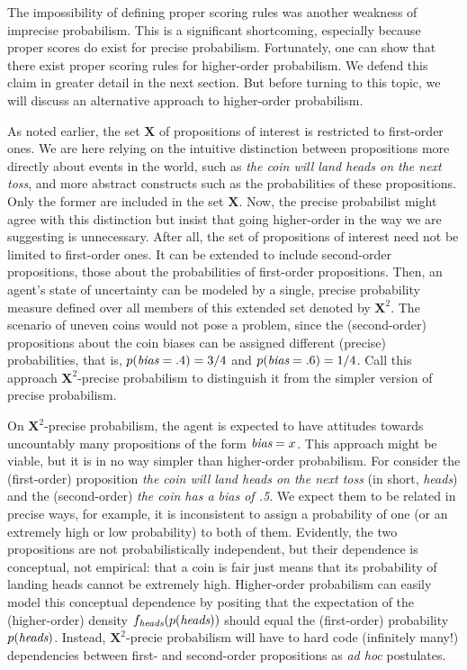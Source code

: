 \documentclass[
  letterpaper,
  DIV=11,
  numbers=noendperiod]{scrartcl}
\begin{document}
The impossibility of defining proper scoring rules was another weakness
of imprecise probabilism. This is a significant shortcoming, especially
because proper scores do exist for precise probabilism. Fortunately, one
can show that there exist proper scoring rules for higher-order
probabilism. We defend this claim in greater detail in the next section.
But before turning to this topic, we will discuss an alternative
approach to higher-order probabilism.

As noted earlier, the set \(\mathbf{X}\) of propositions of interest is
restricted to first-order ones. We are here relying on the intuitive
distinction between propositions more directly about events in the
world, such as \emph{the coin will land heads on the next toss}, and
more abstract constructs such as the probabilities of these
propositions. Only the former are included in the set \(\mathbf{X}\).
Now, the precise probabilist might agree with this distinction but
insist that going higher-order in the way we are suggesting is
unnecessary. After all, the set of propositions of interest need not be
limited to first-order ones. It can be extended to include second-order
propositions, those about the probabilities of first-order propositions.
Then, an agent's state of uncertainty can be modeled by a single,
precise probability measure defined over all members of this extended
set denoted by \(\mathbf{X}^2\). The scenario of uneven coins would not
pose a problem, since the (second-order) propositions about the coin
biases can be assigned different (precise) probabilities, that is,
\(p(\emph{bias}=.4)=3/4\) and \(p(\emph{bias}=.6)=1/4\). Call this
approach \(\mathbf{X}^2\)-precise probabilism to distinguish it from the
simpler version of precise probabilism.

On \(\mathbf{X}^2\)-precise probabilism, the agent is expected to have
attitudes towards uncountably many propositions of the form
\(\emph{bias}=x\). This approach might be viable, but it is in no way
simpler than higher-order probabilism. For consider the (first-order)
proposition \emph{the coin will land heads on the next toss} (in short,
\emph{heads}) and the (second-order) \emph{the coin has a bias of .5}.
We expect them to be related in precise ways, for example, it is
inconsistent to assign a probability of one (or an extremely high or low
probability) to both of them. Evidently, the two propositions are not
probabilistically independent, but their dependence is conceptual, not
empirical: that a coin is fair just means that its probability of
landing heads cannot be extremely high. Higher-order probabilism can
easily model this conceptual dependence by positing that the expectation
of the (higher-order) density \(f_{\emph{heads}}(p(\emph{heads}))\)
should equal the (first-order) probability \(p(\emph{heads})\). Instead,
\(\mathbf{X}^2\)-precie probabilism will have to hard code (infinitely
many!) dependencies between first- and second-order propositions as
\textit{ad hoc} postulates.
\end{document}
